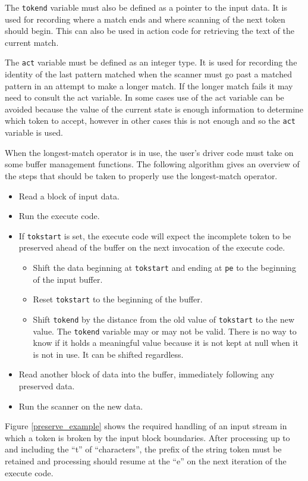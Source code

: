\documentclass[letterpaper,11pt,oneside]{book}
\begin{document}
The \verb|tokend| variable must also be defined as a pointer to the input data.
It is used for recording where a match ends and where scanning of the next
token should begin. This can also be used in action code for retrieving the
text of the current match.

The \verb|act| variable must be defined as an integer type. It is used for
recording the identity of the last pattern matched when the scanner must go
past a matched pattern in an attempt to make a longer match. If the longer
match fails it may need to consult the act variable. In some cases use of the act
variable can be avoided because the value of the current state is enough
information to determine which token to accept, however in other cases this is
not enough and so the \verb|act| variable is used. 

When the longest-match operator is in use, the user's driver code must take on
some buffer management functions. The following algorithm gives an overview of
the steps that should be taken to properly use the longest-match operator.

\begin{itemize}
\setlength{\parskip}{0pt}
\item Read a block of input data.
\item Run the execute code.
\item If \verb|tokstart| is set, the execute code will expect the incomplete
token to be preserved ahead of the buffer on the next invocation of the execute
code.  
\begin{itemize}
\item Shift the data beginning at \verb|tokstart| and ending at \verb|pe| to the
beginning of the input buffer.
\item Reset \verb|tokstart| to the beginning of the buffer. 
\item Shift \verb|tokend| by the distance from the old value of \verb|tokstart|
to the new value. The \verb|tokend| variable may or may not be valid.  There is
no way to know if it holds a meaningful value because it is not kept at null
when it is not in use. It can be shifted regardless.
\end{itemize}
\item Read another block of data into the buffer, immediately following any
preserved data.
\item Run the scanner on the new data.
\end{itemize}

Figure \ref{preserve_example} shows the required handling of an input stream in
which a token is broken by the input block boundaries. After processing up to
and including the ``t'' of ``characters'', the prefix of the string token must be
retained and processing should resume at the ``e'' on the next iteration of
the execute code.
\end{document}
